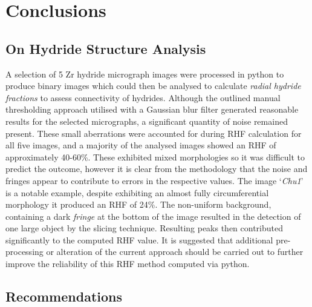 \documentclass{article}
\begin{document}
\section{Conclusions}
\subsection{On Hydride Structure Analysis}
\noindent 
A selection of 5 Zr hydride micrograph images were processed in python to produce binary images which could then be analysed to calculate \textit{radial hydride fractions} to assess connectivity of hydrides. Although the outlined manual thresholding approach utilised with a Gaussian blur filter generated reasonable results for the selected micrographs, a significant quantity of noise remained present. These small aberrations were accounted for during RHF calculation for all five images, and a majority of the analysed images showed an RHF of approximately 40-60\%. These exhibited mixed morphologies so it was difficult to predict the outcome, however it is clear from the methodology that the noise and fringes appear to contribute to errors in the respective values. The image ‘\textit{Chu1}’ is a notable example, despite exhibiting an almost fully circumferential morphology it produced an RHF of 24\%. The non-uniform background, containing a dark \textit{fringe} at the bottom of the image resulted in the detection of one large object by the slicing technique. Resulting peaks then contributed significantly to the computed RHF value. It is suggested that additional pre-processing or alteration of the current approach should be carried out to further improve the reliability of this RHF method computed via python.

\subsection{Recommendations}
\end{document}
